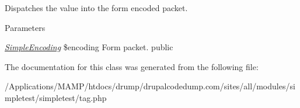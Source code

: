 \label{class_simple_tag_group_a2fc52631817cbe0d5bd5f7dda5cf87ec}
Dispatches the value into the form encoded packet. 
\begin{DoxyParams}{Parameters}
\item[{\em \hyperlink{class_simple_encoding}{SimpleEncoding}}]\$encoding Form packet.  public \end{DoxyParams}


The documentation for this class was generated from the following file:\begin{DoxyCompactItemize}
\item 
/Applications/MAMP/htdocs/drump/drupalcodedump.com/sites/all/modules/simpletest/simpletest/tag.php\end{DoxyCompactItemize}
